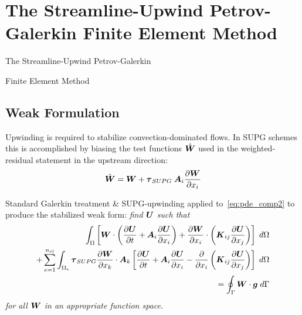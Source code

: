 \documentclass[compress,11pt]{beamer}
\begin{document}
\section[SUPG FEM]{The Streamline-Upwind Petrov-Galerkin Finite Element Method}
\frame
{
  \vspace{4em}
  \centerline{\huge{The Streamline-Upwind Petrov-Galerkin}}
  \vspace{.5em}

  \centerline{\huge{Finite Element Method}}
}

\subsection{Weak Formulation}
\frame
{
  \vspace{-.5em}
  \small
  Upwinding is required to stabilize convection-dominated flows. In SUPG schemes this is accomplished by biasing the test functions $\hat{{\boldsymbol{W}}}$ used in the weighted-residual statement in the upstream direction:
  \begin{equation}
     \hat{{\boldsymbol{W}}} = {\boldsymbol{W}} + {\boldsymbol{\tau}}_{SUPG}\;{\boldsymbol{A}}_i{\frac{\partial{{\boldsymbol{W}}}}{\partial{x_i}}}
  \end{equation}
   {
   	Standard Galerkin treatment \& SUPG-upwinding applied to~\eqref{eq:pde_comp2} to produce the stabilized weak form: \emph{find ${\boldsymbol{U}}$ such that}
   	\begin{eqnarray}
   	  \label{eq:comp_weak_SUPG}
   	  \int_\Omega  \left[ {\boldsymbol{W}}\cdot\left({\frac{\partial{{\boldsymbol{U}}}}{\partial{t}}} + {\boldsymbol{A}}_i {\frac{\partial{{\boldsymbol{U}}}}{\partial{x_i}}} \right) + {\frac{\partial{{\boldsymbol{W}}}}{\partial{x_i}}} \cdot \left( {\boldsymbol{K}}_{ij} {\frac{\partial{{\boldsymbol{U}}}}{\partial{x_j}}} \right) \right] \; d\Omega \nonumber \\
   	  + \sum_{e=1}^{n_{el}} \int_{\Omega_e} {\boldsymbol{\tau}}_{SUPG} {\frac{\partial{{\boldsymbol{W}}}}{\partial{x_k}}}\cdot{\boldsymbol{A}}_k
   	  \left[ {\frac{\partial{{\boldsymbol{U}}}}{\partial{t}}} + {\boldsymbol{A}}_i {\frac{\partial{{\boldsymbol{U}}}}{\partial{x_i}}} - {\frac{\partial{}}{\partial{x_i}}} \left( {\boldsymbol{K}}_{ij} {\frac{\partial{{\boldsymbol{U}}}}{\partial{x_j}}} \right) \right] \; d\Omega  \nonumber \\
   	  = \oint_\Gamma {\boldsymbol{W}}\cdot{\boldsymbol{g}} \; d\Gamma
   	\end{eqnarray}
   	\emph{for all ${\boldsymbol{W}}$ in an appropriate function space}.
  
   }
}
\end{document}
